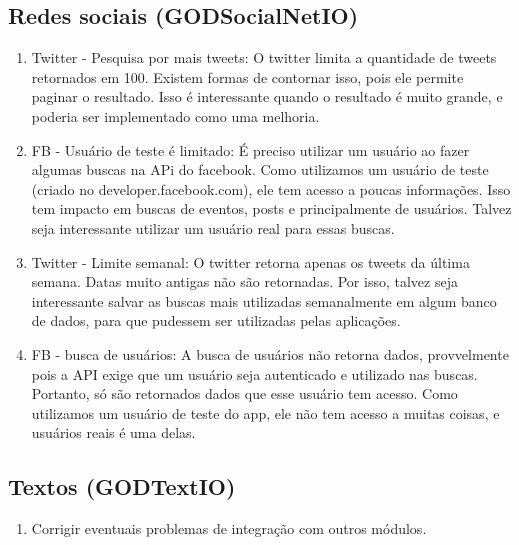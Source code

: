 \subsection{Redes sociais (GODSocialNetIO)}
\begin{enumerate}
\item Twitter - Pesquisa por mais tweets: O twitter limita a quantidade de tweets retornados em 100. Existem formas de contornar isso, pois ele permite paginar o resultado. Isso é interessante quando o resultado é muito grande, e poderia ser implementado como uma melhoria.
\item FB - Usuário de teste é limitado: É preciso utilizar um usuário ao fazer algumas buscas na APi do facebook. Como utilizamos um usuário de teste (criado no developer.facebook.com), ele tem acesso a poucas informações. Isso tem impacto em buscas de eventos, posts e principalmente de usuários. Talvez seja interessante utilizar um usuário real para essas buscas.
\item Twitter - Limite semanal: O twitter retorna apenas os tweets da última semana. Datas muito antigas não são retornadas. Por isso, talvez seja interessante salvar as buscas mais utilizadas semanalmente em algum banco de dados, para que pudessem ser utilizadas pelas aplicações.
\item FB - busca de usuários: A busca de usuários não retorna dados, provvelmente pois a API exige que um usuário seja autenticado e utilizado nas buscas. Portanto, só são retornados dados que esse usuário tem acesso. Como utilizamos um usuário de teste do app, ele não tem acesso a muitas coisas, e usuários reais é uma delas.
\end{enumerate}

\subsection{Textos (GODTextIO)}
\begin{enumerate}
\item Corrigir eventuais problemas de integração com outros módulos.
\end{enumerate}

